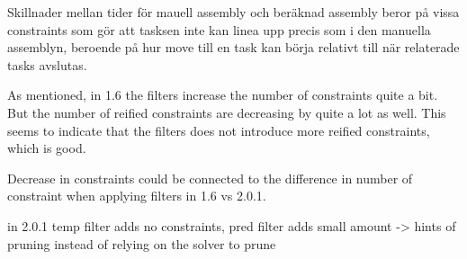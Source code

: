 Skillnader mellan tider för mauell assembly och beräknad assembly beror på vissa constraints som gör att tasksen inte kan linea upp precis som i den manuella assemblyn, beroende på hur move till en task kan börja relativt till när relaterade tasks avslutas.

As mentioned, in 1.6 the filters increase the number of constraints quite a bit. But the number of reified constraints are decreasing by quite a lot as well. This seems to indicate that the filters does not introduce more reified constraints, which is good.

Decrease in constraints could be connected to the difference in number of constraint when applying filters in 1.6 vs 2.0.1.

in 2.0.1 temp filter adds no constraints, pred filter adds small amount -> hints of pruning instead of relying on the solver to prune



